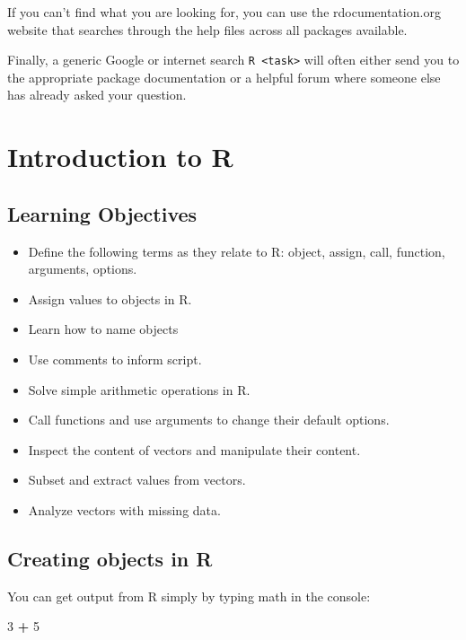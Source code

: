\documentclass[]{book}
\newenvironment{Shaded}{\begin{snugshade}}{\end{snugshade}}
\newcommand{\DecValTok}[1]{\textcolor[rgb]{0.00,0.00,0.81}{#1}}
\newcommand{\StringTok}[1]{\textcolor[rgb]{0.31,0.60,0.02}{#1}}
\newcommand{\OperatorTok}[1]{\textcolor[rgb]{0.81,0.36,0.00}{\textbf{#1}}}
\providecommand{\tightlist}{%
  \setlength{\itemsep}{0pt}\setlength{\parskip}{0pt}}
\begin{document}
If you can't find what you are looking for, you can use the
rdocumentation.org website that searches through the help files across
all packages available.

Finally, a generic Google or internet search
\texttt{R\ \textless{}task\textgreater{}} will often either send you to
the appropriate package documentation or a helpful forum where someone
else has already asked your question.

\chapter{Introduction to R}\label{introduction-to-r}

\section{Learning Objectives}\label{learning-objectives}

\begin{itemize}
\tightlist
\item
  Define the following terms as they relate to R: object, assign, call,
  function, arguments, options.
\item
  Assign values to objects in R.
\item
  Learn how to name objects
\item
  Use comments to inform script.
\item
  Solve simple arithmetic operations in R.
\item
  Call functions and use arguments to change their default options.
\item
  Inspect the content of vectors and manipulate their content.
\item
  Subset and extract values from vectors.
\item
  Analyze vectors with missing data.
\end{itemize}

\section{Creating objects in R}\label{creating-objects-in-r}

You can get output from R simply by typing math in the console:

\begin{Shaded}
\begin{Highlighting}[]
\DecValTok{3} \OperatorTok{+}\StringTok{ }\DecValTok{5}
\end{Highlighting}
\end{Shaded}
\end{document}
